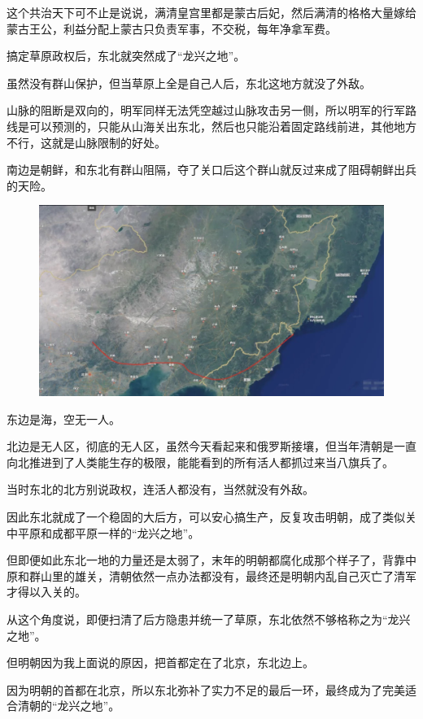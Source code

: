 \documentclass[UTF8, 11pt, oneside]{ctexart}
\begin{document}
这个共治天下可不止是说说，满清皇宫里都是蒙古后妃，然后满清的格格大量嫁给蒙古王公，利益分配上蒙古只负责军事，不交税，每年净拿军费。

搞定草原政权后，东北就突然成了“龙兴之地”。

虽然没有群山保护，但当草原上全是自己人后，东北这地方就没了外敌。

山脉的阻断是双向的，明军同样无法凭空越过山脉攻击另一侧，所以明军的行军路线是可以预测的，只能从山海关出东北，然后也只能沿着固定路线前进，其他地方不行，这就是山脉限制的好处。

南边是朝鲜，和东北有群山阻隔，夺了关口后这个群山就反过来成了阻碍朝鲜出兵的天险。

\begin{figure}[H]
    \centering
    \includegraphics[width=13cm]{2024-08-19-009.jpg}
\end{figure}

东边是海，空无一人。

北边是无人区，彻底的无人区，虽然今天看起来和俄罗斯接壤，但当年清朝是一直向北推进到了人类能生存的极限，能能看到的所有活人都抓过来当八旗兵了。

当时东北的北方别说政权，连活人都没有，当然就没有外敌。

因此东北就成了一个稳固的大后方，可以安心搞生产，反复攻击明朝，成了类似关中平原和成都平原一样的“龙兴之地”。

但即便如此东北一地的力量还是太弱了，末年的明朝都腐化成那个样子了，背靠中原和群山里的雄关，清朝依然一点办法都没有，最终还是明朝内乱自己灭亡了清军才得以入关的。

从这个角度说，即便扫清了后方隐患并统一了草原，东北依然不够格称之为“龙兴之地”。

但明朝因为我上面说的原因，把首都定在了北京，东北边上。

因为明朝的首都在北京，所以东北弥补了实力不足的最后一环，最终成为了完美适合清朝的“龙兴之地”。
\end{document}
